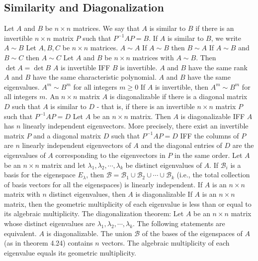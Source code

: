 \documentclass{article}
\begin{document}
    \subsection{Similarity and Diagonalization}
    \begin{outline}
        \1 Let $A$ and $B$ be \(n\times n\) matrices. We say that $A$ is similar to $B$ if there is an invertible \(n\times n\) matrix $P$ such that \(P^{-1}AP=B\). If \(A\) is similar to \(B\), we write \(A\sim B\)
        \1 Let \(A,B,C\) be \(n\times n\) matrices. 
            \2 \(A\sim A\)
            \2 If \(A\sim B\) then \(B\sim A\)
            \2 If \(A\sim B\) and \(B\sim C\) then \(A\sim C\)
        \1 Let \(A\) and \(B\) be \(n\times n\) matrices with \(A\sim B\). Then 
            \2 \(\det A=\det B\)
            \2 \(A\) is invertible IFF \(B\) is invertible. 
            \2 \(A\) and \(B\) have the same rank 
            \2 \(A\) and \(B\) have the same characteristic polynomial. 
            \2 \(A\) and \(B\) have the same eigenvalues. 
            \2 \(A^m\sim B^m\) for all integers \(m\geq 0\)
            \2 If \(A\) is invertible, then \(A^m\sim B^m\) for all integers \(m\). 
        \1 An \(n\times n\) matrix \(A\) is diagonalizable if there is a diagonal matrix \(D\) such that \(A\) is similar to \(D\) - that is, if there is an invertible \(n\times n\) matrix \(P\) such that \(P^{-1}AP=D\)
        \1 Let \(A\) be an \(n\times n\) matrix. Then \(A\) is diagonalizable IFF $A$ has \(n\) linearly independent eigenvectors. More precisely, there exist an invertible matrix $P$ and a diagonal matrix $D$ such that \(P^{-1}AP=D\) IFF the columns of $P$ are \(n\) linearly independent eigenvectors of \(A\) and the diagonal entries of $D$ are the eigenvalues of $A$ corresponding to the eigenvectors in $P$ in the same order. 
        \1 Let \(A\) be an \(n\times n\) matrix and let \(\lambda_1,\lambda_2,\cdots,\lambda_k\) be distinct eigenvalues of $A$. If \(\mathcal B_i\) is a basis for the eigenspace \(E_\lambda\), then \(\mathcal B=\mathcal B_1\cup\mathcal B_2\cup\cdots\cup\mathcal B_k\) (i.e., the total collection of basis vectors for all the eigenspaces) is linearly independent. 
        \1 If $A$ is an \(n\times n\) matrix with \(n\) distinct eigenvalues, then \(A\) is diagonalizable
        \1 If $A$ is an \(n\times n\) matrix, then the geometric multiplicity of each eigenvalue is less than or equal to its algebraic multiplicity. 
        \1 The diagonalization theorem: Let $A$ be an \(n\times n\) matrix whose distinct eigenvalues are \(\lambda_1,\lambda_2,\cdots,\lambda_k\). The following statements are equivalent. 
            \2 $A$ is diagonalizable. 
            \2 The union \(\mathcal B\) of the bases of the eigenspaces of $A$ (as in theorem 4.24) contains \(n\) vectors. 
            \2 The algebraic multiplicity of each eigenvalue equals its geometric multiplicity. 
        
    \end{outline}
    
\end{document}
